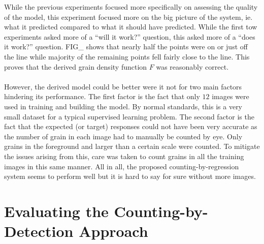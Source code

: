 While the previous experiments focused more specifically on assessing the quality of the model, this experiment focused more on the big picture of the system, ie. what it predicted compared to what it should have predicted. While the first tow experiments asked more of a ``will it work?'' question, this asked more of a ``does it work?'' question. FIG\_ shows that nearly half the points were on or just off the line while majority of the remaining points fell fairly close to the line. This proves that the derived grain density function $F$ was reasonably correct.\\ \\
%
However, the derived model could be better were it not for two main factors hindering its performance. The first factor is the fact that only $12$ images were used in training and building the model. By normal standards, this is a very small dataset for a typical supervised learning problem. The second factor is the fact that the expected (or target) responses could not have been very accurate as the number of grain in each image had to manually be counted by eye. Only grains in the foreground and larger than a certain scale were counted. To mitigate the issues arising from this, care was taken to count grains in all the training images in this same manner. All in all, the proposed counting-by-regression system seems to perform well but it is hard to say for sure without more images.

\section{Evaluating the Counting-by-Detection Approach}
